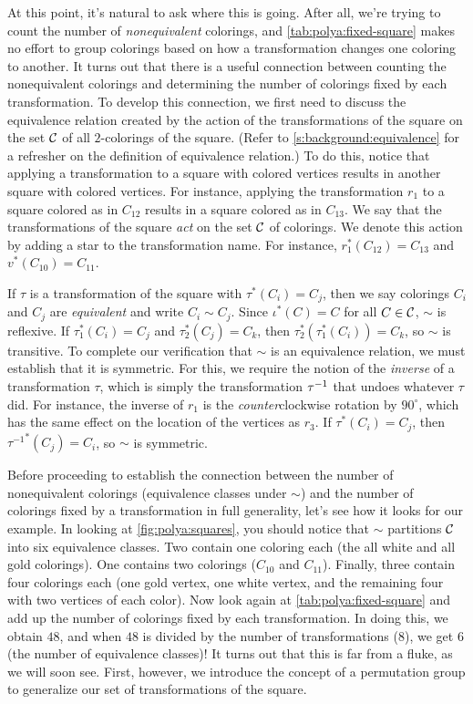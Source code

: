 At this point, it's natural to ask where this is going. After all,
we're trying to count the number of \emph{nonequivalent} colorings,
and \autoref{tab:polya:fixed-square} makes no effort to group
colorings based on how a transformation changes one coloring to
another. It turns out that there is a useful connection between
counting the nonequivalent colorings and determining the number of
colorings fixed by each transformation. To develop this connection, we
first need to discuss the equivalence relation created by the action
of the transformations of the square on the set $\mathcal{C}$ of all
$2$-colorings of the square. (Refer to
\autoref{s:background:equivalence} for a refresher on the definition of
equivalence relation.) To do this, notice that applying a
transformation to a square with colored vertices results in another
square with colored vertices. For instance, applying the
transformation $r_1$ to a square colored as in $C_{12}$ results in a
square colored as in $C_{13}$. We say that the transformations of the
square \emph{act} on the set $\mathcal{C}$ of colorings. We denote this
action by adding a star to the transformation name. For instance,
$r_1^*(C_{12})=C_{13}$ and $v^*(C_{10})=C_{11}$.

If $\tau$ is a transformation of the square with $\tau^*(C_i) = C_j$,
then we say colorings $C_i$ and $C_j$ are \emph{equivalent} and write
$C_i\sim C_j$. Since $\iota^*(C)=C$ for all $C\in\mathcal{C}$, $\sim$ is
reflexive. If $\tau_1^*(C_i) = C_j$ and $\tau_2^*(C_j) = C_k$, then
$\tau_2^*(\tau_1^*(C_i)) = C_k$, so $\sim$ is transitive. To complete
our verification that $\sim$ is an equivalence relation, we must
establish that it is symmetric. For this, we require the notion of the
\emph{inverse} of a transformation $\tau$, which is simply the
transformation $\tau^{-1}$ that undoes whatever $\tau$ did. For
instance, the inverse of $r_1$ is the \emph{counter}clockwise rotation
by $90^\circ$, which has the same effect on the location of the
vertices as $r_3$. If $\tau^*(C_i) = C_j$, then ${\tau^{-1}}^*(C_j) =
C_i$, so $\sim$ is symmetric. 

Before proceeding to establish the connection between the number of
nonequivalent colorings (equivalence classes under $\sim$) and the
number of colorings fixed by a transformation in full generality,
let's see how it looks for our example. In looking at
\autoref{fig:polya:squares}, you should notice that $\sim$ partitions
$\mathcal{C}$ into six equivalence classes. Two contain one coloring each
(the all white and all gold colorings). One contains two colorings
($C_{10}$ and $C_{11}$). Finally, three contain four colorings each
(one gold vertex, one white vertex, and the remaining four with two
vertices of each color). Now look again at
\autoref{tab:polya:fixed-square} and add up the number of colorings
fixed by each transformation. In doing this, we obtain $48$, and when
$48$ is divided by the number of transformations ($8$), we get $6$
(the number of equivalence classes)! It turns out that this is far
from a fluke, as we will soon see. First, however, we introduce the
concept of a permutation group to generalize our set of
transformations of the square.

